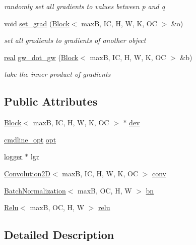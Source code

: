 \begin{DoxyCompactItemize}
\begin{DoxyCompactList}\small\item\em randomly set all gradients to values between p and q \end{DoxyCompactList}\item 
void \hyperlink{structBlock_ae0db7335928b4b004b644f2ef3ac1bc0}{set\+\_\+grad} (\hyperlink{structBlock}{Block}$<$ maxB, IC, H, W, K, OC $>$ \&o)
\begin{DoxyCompactList}\small\item\em set all gradients to gradients of another object \end{DoxyCompactList}\item 
\hyperlink{vgg__util_8h_a1082d08aaa761215ec83e7149f27ad16}{real} \hyperlink{structBlock_a69a63d3357f60c7b097e97169b175445}{gw\+\_\+dot\+\_\+gw} (\hyperlink{structBlock}{Block}$<$ maxB, IC, H, W, K, OC $>$ \&b)
\begin{DoxyCompactList}\small\item\em take the inner product of gradients \end{DoxyCompactList}\end{DoxyCompactItemize}
\subsection*{Public Attributes}
\begin{DoxyCompactItemize}
\item 
\hyperlink{structBlock}{Block}$<$ maxB, IC, H, W, K, OC $>$ $\ast$ \hyperlink{structBlock_a66767aae2045de05ce1dc09a92d164c4}{dev}
\item 
\hyperlink{structcmdline__opt}{cmdline\+\_\+opt} \hyperlink{structBlock_ad91e112b767ccd7035a37873cbc121a9}{opt}
\item 
\hyperlink{structlogger}{logger} $\ast$ \hyperlink{structBlock_a8e037036c2020d2ac98fc0792d3f84f4}{lgr}
\item 
\hyperlink{structConvolution2D}{Convolution2D}$<$ maxB, IC, H, W, K, OC $>$ \hyperlink{structBlock_aac195c086bc1302e8324aa1d89067668}{conv}
\item 
\hyperlink{structBatchNormalization}{Batch\+Normalization}$<$ maxB, OC, H, W $>$ \hyperlink{structBlock_afedad10fac693a934c1d72e24d478b6b}{bn}
\item 
\hyperlink{structRelu}{Relu}$<$ maxB, OC, H, W $>$ \hyperlink{structBlock_a019bcbd200d92669079eaa3c0c00ddfc}{relu}
\end{DoxyCompactItemize}


\subsection{Detailed Description}
